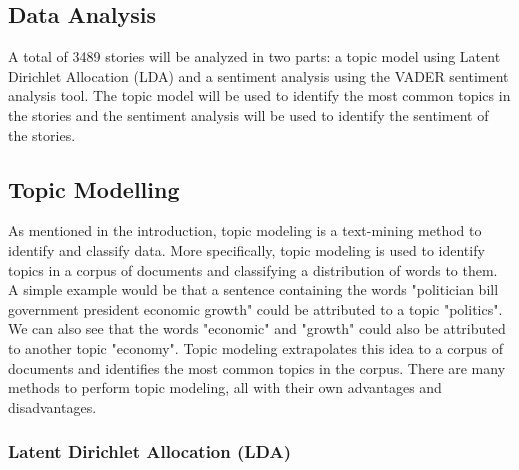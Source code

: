 \subsection{Data Analysis}

A total of 3489 stories will be analyzed in two parts: a topic model using Latent Dirichlet Allocation (LDA) and a sentiment analysis using the VADER sentiment analysis tool. The topic model will be used to identify the most common topics in the stories and the sentiment analysis will be used to identify the sentiment of the stories.

\subsection{Topic Modelling}

As mentioned in the introduction, topic modeling is a text-mining method to identify and classify data. More specifically, topic modeling is used to identify topics in a corpus of documents and classifying a distribution of words to them. A simple example would be that a sentence containing the words "politician bill government president economic growth" could be attributed to a topic "politics". We can also see that the words "economic" and "growth" could also be attributed to another topic "economy". Topic modeling extrapolates this idea to a corpus of documents and identifies the most common topics in the corpus. There are many methods to perform topic modeling, all with their own advantages and disadvantages.

\subsubsection{Latent Dirichlet Allocation (LDA)}

